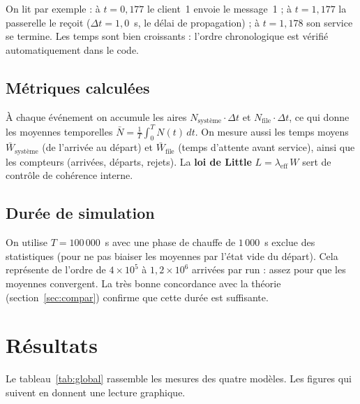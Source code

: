 \documentclass[11pt,a4paper]{article}
\begin{document}


On lit par exemple : à $t=0{,}177$ le client~1 envoie le message~1 ; à
$t=1{,}177$ la passerelle le reçoit ($\Delta t = 1{,}0$~s, le délai de
propagation) ; à $t=1{,}178$ son service se termine. Les temps sont bien
croissants : l'ordre chronologique est vérifié automatiquement dans le code.

\subsection{Métriques calculées}
À chaque événement on accumule les aires $N_{\text{système}}\cdot\Delta t$ et
$N_{\text{file}}\cdot\Delta t$, ce qui donne les moyennes temporelles
$\bar N = \frac{1}{T}\int_0^T N(t)\,dt$. On mesure aussi les temps moyens
$\bar W_{\text{système}}$ (de l'arrivée au départ) et $\bar W_{\text{file}}$ (temps
d'attente avant service), ainsi que les compteurs (arrivées, départs, rejets).
La \textbf{loi de Little} $L = \lambda_{\text{eff}}\,W$ sert de contrôle de
cohérence interne.

\subsection{Durée de simulation}
On utilise $T = 100\,000$~s avec une phase de chauffe de $1\,000$~s exclue des
statistiques (pour ne pas biaiser les moyennes par l'état vide du départ). Cela
représente de l'ordre de $4\times10^5$ à $1{,}2\times10^6$ arrivées par run :
assez pour que les moyennes convergent. La très bonne concordance avec la
théorie (section~\ref{sec:compar}) confirme que cette durée est suffisante.

\section{Résultats}
Le tableau~\ref{tab:global} rassemble les mesures des quatre modèles. Les
figures qui suivent en donnent une lecture graphique.
\end{document}
